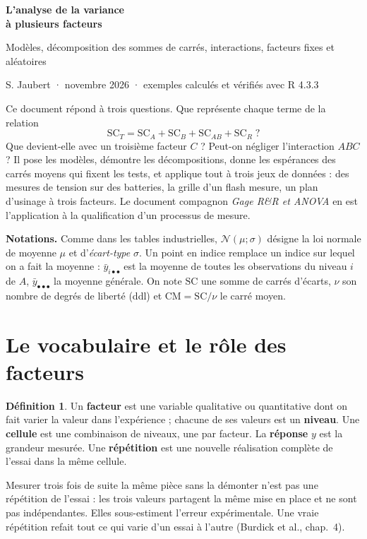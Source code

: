 \documentclass[11pt,a4paper]{article}
\theoremstyle{sj}
\theoremstyle{definition}
\newtheorem{defi}{Définition}
\theoremstyle{remark}
\newcommand{\N}{\mathcal{N}}
\newcommand{\SC}{\mathrm{SC}}
\newcommand{\CM}{\mathrm{CM}}
\newcommand{\ybar}{\bar y}
\newcommand{\dotp}{{\scriptscriptstyle\bullet}}
\begin{document}
{\raggedright\Huge\bfseries\color{bleu} L'analyse de la variance\\[4pt] à plusieurs facteurs\par}
\medskip
{\large Modèles, décomposition des sommes de carrés, interactions, facteurs fixes et aléatoires\par}
\medskip
{\small S. Jaubert · novembre 2026 · exemples calculés et vérifiés avec R 4.3.3\par}

\bigskip
Ce document répond à trois questions. Que représente chaque terme de la relation
\[
\SC_T=\SC_A+\SC_B+\SC_{AB}+\SC_R \;?
\]
Que devient-elle avec un troisième facteur $C$ ? Peut-on négliger l'interaction $ABC$ ? Il pose les modèles, démontre les décompositions, donne les espérances des carrés moyens qui fixent les tests, et applique tout à trois jeux de données : des mesures de tension sur des batteries, la grille d'un flash mesure, un plan d'usinage à trois facteurs. Le document compagnon \emph{Gage R\&R et ANOVA} en est l'application à la qualification d'un processus de mesure.

\textbf{Notations.} Comme dans les tables industrielles, $\N(\mu;\sigma)$ désigne la loi normale de moyenne $\mu$ et d'\emph{écart-type} $\sigma$. Un point en indice remplace un indice sur lequel on a fait la moyenne : $\ybar_{i\dotp\dotp}$ est la moyenne de toutes les observations du niveau $i$ de $A$, $\ybar_{\dotp\dotp\dotp}$ la moyenne générale. On note $\SC$ une somme de carrés d'écarts, $\nu$ son nombre de degrés de liberté (ddl) et $\CM=\SC/\nu$ le carré moyen.

\tableofcontents

\section{Le vocabulaire et le rôle des facteurs}

\begin{defi}
Un \textbf{facteur} est une variable qualitative ou quantitative dont on fait varier la valeur dans l'expérience ; chacune de ses valeurs est un \textbf{niveau}. Une \textbf{cellule} est une combinaison de niveaux, une par facteur. La \textbf{réponse} $y$ est la grandeur mesurée. Une \textbf{répétition} est une nouvelle réalisation complète de l'essai dans la même cellule.
\end{defi}

\begin{attention}
Mesurer trois fois de suite la même pièce sans la démonter n'est pas une répétition de l'essai : les trois valeurs partagent la même mise en place et ne sont pas indépendantes. Elles sous-estiment l'erreur expérimentale. Une vraie répétition refait tout ce qui varie d'un essai à l'autre (Burdick et al., chap.~4).
\end{attention}
\end{document}
